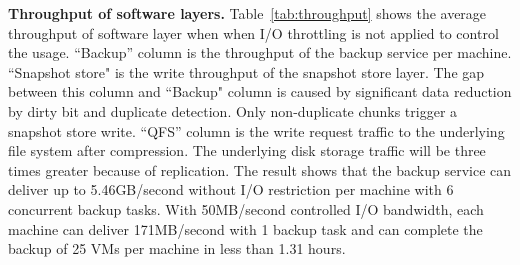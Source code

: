 {\bf Throughput of software layers.}
Table~\ref{tab:throughput} shows the  average throughput of software layer
when when I/O throttling is not applied to control the usage.
``Backup'' column is the throughput  of the backup service  per machine.
``Snapshot store" is the  write throughput of the snapshot store layer. The gap between this
column and  ``Backup" column is caused by significant data reduction by dirty bit and duplicate
detection. Only non-duplicate chunks trigger a snapshot store write.
``QFS'' column is the write request traffic to the underlying file system after compression.
The underlying disk storage traffic will be three times greater because of replication.
The result shows that the backup service can deliver up to 5.46GB/second without I/O restriction
per machine with 6 concurrent backup tasks. With 50MB/second controlled I/O bandwidth, each machine can deliver 171MB/second with 1 backup task and can complete the backup of 25 VMs per machine in less than 1.31 hours.
 



